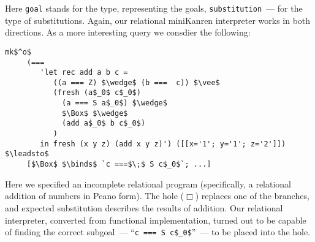 Here \lstinline|goal| stands for the type, representing the goals, \lstinline|substitution|~--- for the type of substitutions. Again, 
our relational miniKanren interpreter works in both directions. As a more interesting query we consdier the following:

\begin{lstlisting}[basicstyle=\small]
   mk$^o$
     (=== 
        'let rec add a b c =
           ((a === Z) $\wedge$ (b ===  c)) $\vee$
           (fresh (a$_0$ c$_0$)
             (a === S a$_0$) $\wedge$
             $\Box$ $\wedge$
             (add a$_0$ b c$_0$)
           )
        in fresh (x y z) (add x y z)') ([[x='1'; y='1'; z='2']])  $\leadsto$   
     [$\Box$ $\binds$ `c ===$\;$ S c$_0$`; ...]
\end{lstlisting}

Here we specified an incomplete relational program (specifically, a relational addition of numbers in Peano form). The hole ($\Box$) replaces
one of the branches, and expected substitution describes the results of addition. Our relational interpreter, converted from functional
implementation, turned out to be capable of finding the correct subgoal~--- ``\lstinline|c === S c$_0$|''~--- to be placed into the hole.


